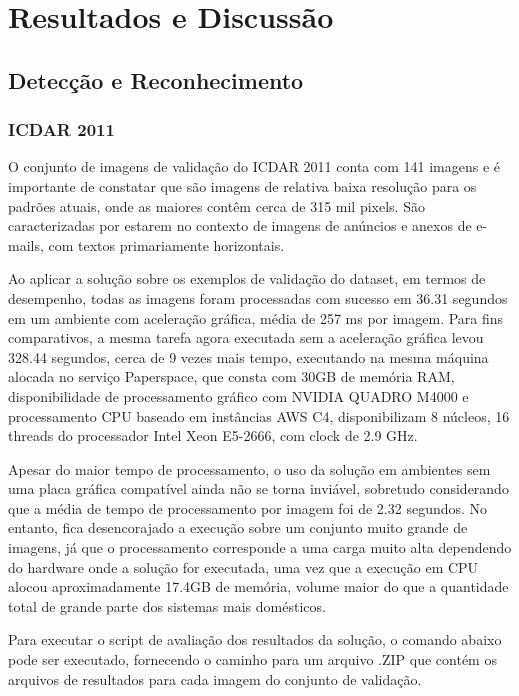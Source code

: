 \chapter{Resultados e Discussão}\label{cap:resultados}

\section{Detecção e Reconhecimento}
\subsection{ICDAR 2011}\label{sec:results_icdar_2011}
O conjunto de imagens de validação do ICDAR 2011 conta com 141 imagens e é importante de constatar que são imagens de relativa baixa resolução para os padrões atuais, onde as maiores contêm cerca de 315 mil pixels. São caracterizadas por estarem no contexto de imagens de anúncios e anexos de e-mails, com textos primariamente horizontais.

Ao aplicar a solução sobre os exemplos de validação do dataset, em termos de desempenho, todas as imagens foram processadas com sucesso em 36.31 segundos em um ambiente com aceleração gráfica, média de 257 ms por imagem. Para fins comparativos, a mesma tarefa agora executada sem a aceleração gráfica levou 328.44 segundos, cerca de 9 vezes mais tempo, executando na mesma máquina alocada no serviço Paperspace, que consta com 30GB de memória RAM, disponibilidade de processamento gráfico com NVIDIA QUADRO M4000 e processamento CPU baseado em instâncias AWS C4, disponibilizam 8 núcleos, 16 threads do processador Intel Xeon E5-2666, com clock de 2.9 GHz.

Apesar do maior tempo de processamento, o uso da solução em ambientes sem uma placa gráfica compatível ainda não se torna inviável, sobretudo considerando que a média de tempo de processamento por imagem foi de 2.32 segundos. No entanto, fica desencorajado a execução sobre um conjunto muito grande de imagens, já que o processamento corresponde a uma carga muito alta dependendo do hardware onde a solução for executada, uma vez que a execução em CPU alocou aproximadamente 17.4GB de memória, volume maior do que a quantidade total de grande parte dos sistemas mais domésticos.

Para executar o script de avaliação dos resultados da solução, o comando abaixo pode ser executado, fornecendo o caminho para um arquivo .ZIP que contém os arquivos de resultados para cada imagem do conjunto de validação.

